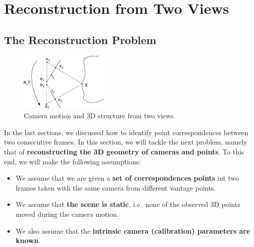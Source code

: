 \section{Reconstruction from Two Views}%
\label{sec:reconstruction_two_views}


\subsection{The Reconstruction Problem}%
\label{sub:the_reconstruction_problem}


\begin{figure}[t]
	\centering
	\includegraphics[width=\linewidth]{img/two-views.pdf}
	\caption{Camera motion and 3D structure from two views.}%
	\label{fig:two_views}
\end{figure}

In the last sections, we discussed how to identify point correspondences
between two consecutive frames. In this section,
we will tackle the next problem, namely that of
\textbf{reconstructing the 3D geometry of cameras and points}.
To this end, we will make the following assumptions:
\begin{itemize}
	\item We assume that we are given a
		\textbf{set of correspondences points} int two frames
		taken with the same camera from different vantage points.
	\item We assume that \textbf{the scene is static},
		i.e.\ none of the observed 3D points moved during the camera motion.
	\item We also assume that the
		\textbf{intrinsic camera (calibration) parameters are known}.
\end{itemize}

